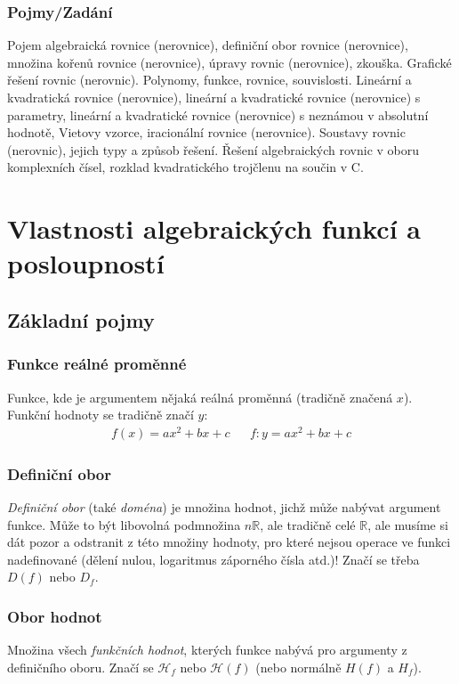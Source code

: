\documentclass[12pt]{article}
\newcommand{\nR}{\mathbb{R}} %
\begin{document}
\subsubsection{Pojmy/Zadání}
Pojem algebraická rovnice (nerovnice), definiční obor rovnice (nerovnice), množina kořenů rovnice (nerovnice), úpravy rovnic (nerovnice), zkouška. Grafické řešení rovnic (nerovnic). Polynomy, funkce, rovnice, souvislosti. Lineární a kvadratická rovnice (nerovnice), lineární a kvadratické rovnice (nerovnice) s parametry, lineární a kvadratické rovnice (nerovnice) s neznámou v absolutní hodnotě, Vietovy vzorce, iracionální rovnice (nerovnice). Soustavy rovnic (nerovnic), jejich typy a způsob řešení. Řešení algebraických rovnic v oboru komplexních čísel, rozklad kvadratického trojčlenu na součin v C.

\section{Vlastnosti algebraických funkcí a posloupností}
\subsection{Základní pojmy}
\subsubsection{Funkce reálné proměnné}
Funkce, kde je argumentem nějaká reálná proměnná (tradičně značená $x$). Funkční hodnoty se tradičně značí $y$:
\begin{align}
f(x) = ax^2 +bx +c && f: y=ax^2 +bx +c
\end{align}
\subsubsection{Definiční obor}
\emph{Definiční obor} (také \emph{doména}) je množina hodnot, jichž může nabývat argument funkce. Může to být libovolná podmnožina $n\nR$, ale tradičně celé $\nR$, ale musíme si dát pozor a odstranit z této množiny hodnoty, pro které nejsou operace ve funkci nadefinované (dělení nulou, logaritmus záporného čísla atd.)! Značí se třeba$D(f)$ nebo $D_f$.
\subsubsection{Obor hodnot}
Množina všech \emph{funkčních hodnot}, kterých funkce nabývá pro argumenty z definičního oboru. Značí se $ \mathcal {H}_{f}$ nebo $\mathcal {H}(f)$ (nebo normálně $H(f)$ a $H_f$).
\end{document}

